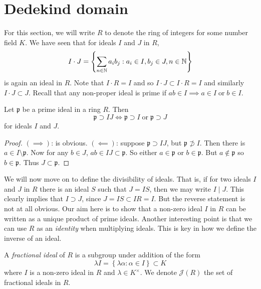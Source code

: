 \section{Dedekind domain}

For this section, we will write $R$ to denote the ring of integers for some
number field $K$.
We have seen that for ideals $I$ and $J$ in $R$,
\[
	I \cdot J = \left\{
		\sum_{n \in \mathbb{N}} a_i b_j: a_i \in I, b_j \in J, n \in \mathbb{N}
	\right\}
\]
is again an ideal in $R$.
Note that
$I \cdot R = I$
and so
$I \cdot J \subset I \cdot R = I$
and similarly 
$I \cdot J \subset J$.
Recall that any non-proper ideal is prime if
$ab \in I \implies a \in I \;\text{or}\; b \in I$.

\begin{lemma}[]
	Let $\mathfrak p$ be a prime ideal in a ring $R$.
	Then
	\[
		\mathfrak p \supset IJ \iff
		\mathfrak p \supset I \;\text{or}\; \mathfrak p \supset J
	\]
	for ideals $I$ and $J$.
\end{lemma}

\begin{proof}
	$(\implies)$: 
	is obvious.
	$(\impliedby)$: 
	suppose 
	$\mathfrak p \supset IJ$, 
	but
	$\mathfrak p \not\supset I$.
	Then there is 
	$a \in I \setminus \mathfrak p$.
	Now for any $b \in J$, 
	$ab \in IJ \subset \mathfrak p$.
	So either $a \in \mathfrak p$ or $b \in \mathfrak p$.
	But $a \not\in \mathfrak p$ so $b \in \mathfrak p$.
	Thus $J \subset \mathfrak p$.
\end{proof}

We will now move on to define the divisibility of ideals.
That is, if for two ideals $I$ and $J$ in $R$ there is an ideal $S$ such that
$J = IS$, then we may write $I \mid J$.
This clearly implies that $I \supset J$, since $J = IS \subset IR = I$.
But the reverse statement is not at all obvious.
Our aim here is to show that a non-zero ideal $I$ in $R$ can be written as a
unique product of prime ideals.
Another interesting point is that we can use $R$ as an \emph{identity} when
multiplying ideals. 
This is key in how we define the inverse of an ideal.

\begin{definition}
	A \emph{fractional ideal} of $R$ is a subgroup under addition of the form
	\[
		\lambda I = \left\{
			\lambda \alpha: \alpha \in I
		\right\} \subset K
	\]
	where $I$ is a non-zero ideal in $R$ and $\lambda \in K^\times$.
	We denote \emph{$\mathcal J(R)$} the set of fractional ideals in $R$.
\end{definition}

